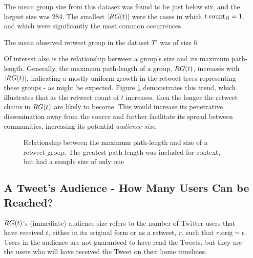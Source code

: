 The mean group size from this dataset was found to be just below six, and the largest size was 284. The smallest $|RG(t)|$ were the cases in which $t.\textrm{count}_R = 1$, and which were significantly the most common occurrences.

\begin{myobservation}
The mean observed retweet group in the dataset $T'$ was of size 6.
\end{myobservation}

Of interest also is the relationship between a group's size and its maximum path-length. Generally, the maximum path-length of a group, $RG(t)$, increases with $|RG(t)|$, indicating a mostly uniform growth in the retweet trees representing these groups - as might be expected. Figure \ref{fig:totalretweets-pathlength} demonstrates this trend, which illustrates that as the retweet count of $t$ increases, then the longer the retweet chains in $RG(t)$ are likely to become. This would increase its penetrative dissemination away from the source and further facilitate its spread between communities, increasing its potential \textit{audience size}.

\begin{figure}[h]
\centering
    \caption{Relationship between the maximum path-length and size of a retweet group. The greatest path-length was included for context, but had a sample size of only one}
\label{fig:totalretweets-pathlength}
\end{figure}

\subsection{A Tweet's Audience - How Many Users Can be Reached?}
\label{section:audience}
$RG(t)$'s (immediate) audience size refers to the number of Twitter users that have received $t$, either in its original form or as a retweet, $r$, such that $r.\textrm{orig} = t$. Users in the audience are not guaranteed to have read the Tweets, but they are the users who will have received the Tweet on their home timelines.


